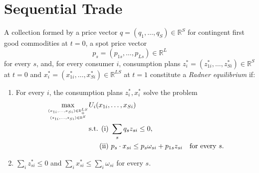 \section{Sequential Trade}

\begin{defn}
    A collection formed by a price vector $q = (q_1, \dots, q_S) \in \mathbb{R}^{S}$ for contingent first good commodities at $t = 0$, a spot price vector
    \begin{equation*}
        p_s = (p_{1s}, \dots, p_{Ls}) \in \mathbb{R}^{L}
    \end{equation*}
    for every $s$, and, for every consumer $i$, consumption plans $z^*_i = (z^*_{1i}, \dots, z^*_{Si}) \in \mathbb{R}^{S}$ at $t = 0$ and $x^*_i = (x^*_{1i}, \dots, x^*_{Si}) \in \mathbb{R}^{LS}$ at $t = 1$ constitute a \emph{Radner equilibrium} if:
    \begin{enumerate}
        \item 
        For every $i$, the consumption plans $z^*_i, x^*_i$ solve the problem
        \begin{equation*}
            \begin{aligned}
                \max_{(x_{1i}, \dots, x_{Si}) \in \mathbb{R}^{LS}_+ \atop (z_{1i}, \dots, z_{Si}) \in \mathbb{R}^{S}} & U_i(x_{1i}, \dots, x_{Si})\\
                &\begin{aligned}
                    \text{s.t. (i) } & \sum_s q_s z_{si} \leq 0, \\
                    \text{(ii) } & p_s \cdot x_{si} \leq p_s \omega_{si} + p_{1s} z_{si} \quad \text{for every } s.
                \end{aligned}
            \end{aligned}
        \end{equation*}

        \item 
        $\sum_i z^*_{si} \leq 0$ and $\sum_i x^*_{si} \leq \sum_i \omega_{si}$ for every $s$.
    \end{enumerate}
\end{defn}


